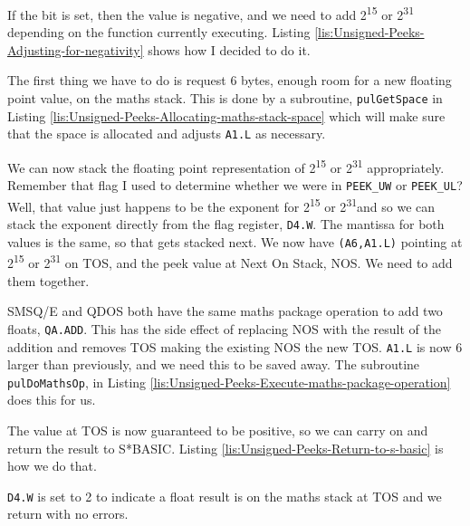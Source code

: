 If the bit is set, then the value is negative, and we need to add
2\textsuperscript{15} or 2\textsuperscript{31} depending on the
function currently executing. Listing \ref{lis:Unsigned-Peeks-Adjusting-for-negativity}
shows how I decided to do it.



The first thing we have to do is request 6 bytes, enough room for
a new floating point value, on the maths stack. This is done by a
subroutine, \texttt{pulGetSpace} in Listing \ref{lis:Unsigned-Peeks-Allocating-maths-stack-space}
which will make sure that the space is allocated and adjusts \texttt{A1.L}
as necessary.

We can now stack the floating point representation of 2\textsuperscript{15}
or 2\textsuperscript{31} appropriately. Remember that flag I used
to determine whether we were in \texttt{PEEK\_UW} or \texttt{PEEK\_UL}?
Well, that value just happens to be the exponent for 2\textsuperscript{15}
or 2\textsuperscript{31}and so we can stack the exponent directly
from the flag register, \texttt{D4.W}. The mantissa for both values
is the same, so that gets stacked next. We now have \texttt{(A6,A1.L)}
pointing at 2\textsuperscript{15} or 2\textsuperscript{31} on TOS,
and the peek value at Next On Stack, NOS. We need to add them together.

SMSQ/E and QDOS both have the same maths package operation to add
two floats, \texttt{QA.ADD}. This has the side effect of replacing
NOS with the result of the addition and removes TOS making the existing
NOS the new TOS. \texttt{A1.L} is now 6 larger than previously, and
we need this to be saved away. The subroutine \texttt{pulDoMathsOp},
in Listing \ref{lis:Unsigned-Peeks-Execute-maths-package-operation}
does this for us.

The value at TOS is now guaranteed to be positive, so we can carry
on and return the result to S{*}BASIC. Listing \ref{lis:Unsigned-Peeks-Return-to-s-basic}
is how we do that.



\texttt{D4.W} is set to 2 to indicate a float result is on the maths
stack at TOS and we return with no errors.

